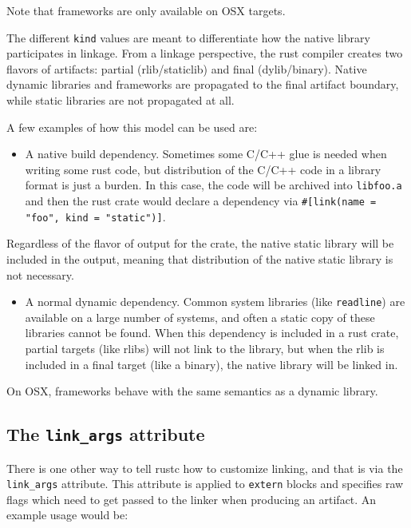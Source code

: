 \documentclass[]{article}
\begin{document}
Note that frameworks are only available on OSX targets.

The different \texttt{kind} values are meant to differentiate how the
native library participates in linkage. From a linkage perspective, the
rust compiler creates two flavors of artifacts: partial (rlib/staticlib)
and final (dylib/binary). Native dynamic libraries and frameworks are
propagated to the final artifact boundary, while static libraries are
not propagated at all.

A few examples of how this model can be used are:

\begin{itemize}
\itemsep1pt\parskip0pt
\item
  A native build dependency. Sometimes some C/C++ glue is needed when
  writing some rust code, but distribution of the C/C++ code in a
  library format is just a burden. In this case, the code will be
  archived into \texttt{libfoo.a} and then the rust crate would declare
  a dependency via
  \texttt{\#{[}link(name = "foo", kind =   "static"){]}}.
\end{itemize}

Regardless of the flavor of output for the crate, the native static
library will be included in the output, meaning that distribution of the
native static library is not necessary.

\begin{itemize}
\itemsep1pt\parskip0pt
\item
  A normal dynamic dependency. Common system libraries (like
  \texttt{readline}) are available on a large number of systems, and
  often a static copy of these libraries cannot be found. When this
  dependency is included in a rust crate, partial targets (like rlibs)
  will not link to the library, but when the rlib is included in a final
  target (like a binary), the native library will be linked in.
\end{itemize}

On OSX, frameworks behave with the same semantics as a dynamic library.

\subsection{The \texttt{link\_args}
attribute}\label{the-linkux5fargs-attribute}

There is one other way to tell rustc how to customize linking, and that
is via the \texttt{link\_args} attribute. This attribute is applied to
\texttt{extern} blocks and specifies raw flags which need to get passed
to the linker when producing an artifact. An example usage would be:
\end{document}
